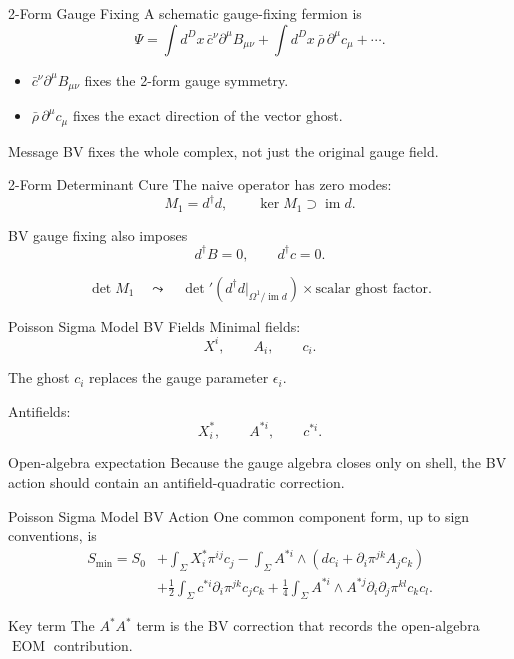 \documentclass[aspectratio=169,professionalfonts]{beamer}
\newcommand{\EOM}{\ensuremath{\operatorname{EOM}}}
\begin{document}
\begin{frame}{2-Form Gauge Fixing}
  A schematic gauge-fixing fermion is
  \[
    \Psi
    =\int d^Dx\,
    \bar c^\nu\partial^\mu B_{\mu\nu}
    +\int d^Dx\,\bar\rho\,\partial^\mu c_\mu+\cdots .
  \]

  \begin{itemize}
    \item $\bar c^\nu\partial^\mu B_{\mu\nu}$ fixes the 2-form gauge symmetry.
    \item $\bar\rho\,\partial^\mu c_\mu$ fixes the exact direction of the vector ghost.
  \end{itemize}

  \begin{block}{Message}
    BV fixes the whole complex, not just the original gauge field.
  \end{block}
\end{frame}

\begin{frame}{2-Form Determinant Cure}
  The naive operator has zero modes:
  \[
    M_1=d^\dagger d,
    \qquad
    \ker M_1\supset \operatorname{im}d .
  \]

  BV gauge fixing also imposes
  \[
    d^\dagger B=0,
    \qquad
    d^\dagger c=0 .
  \]

  \[
    \det M_1
    \quad\leadsto\quad
    \det{}'\!\left(d^\dagger d\big|_{\Omega^1/\operatorname{im}d}\right)
    \times
    \text{scalar ghost factor}.
  \]
\end{frame}

\begin{frame}{Poisson Sigma Model BV Fields}
  Minimal fields:
  \[
    X^i,
    \qquad
    A_i,
    \qquad
    c_i .
  \]

  The ghost $c_i$ replaces the gauge parameter $\epsilon_i$.

  Antifields:
  \[
    X_i^*,
    \qquad
    A^{*i},
    \qquad
    c^{*i}.
  \]

  \begin{block}{Open-algebra expectation}
    Because the gauge algebra closes only on shell, the BV action should
    contain an antifield-quadratic correction.
  \end{block}
\end{frame}

\begin{frame}{Poisson Sigma Model BV Action}
  \small
  One common component form, up to sign conventions, is
  \[
  \begin{aligned}
    S_{\min}=S_0
    &+\int_\Sigma X_i^*\pi^{ij}c_j
    -\int_\Sigma A^{*i}\wedge
    \left(dc_i+\partial_i\pi^{jk}A_jc_k\right)\\
    &+\frac12\int_\Sigma c^{*i}\partial_i\pi^{jk}c_jc_k
    +\frac14\int_\Sigma A^{*i}\wedge A^{*j}
    \partial_i\partial_j\pi^{kl}c_kc_l .
  \end{aligned}
  \]

  \begin{alertblock}{Key term}
    The $A^*A^*$ term is the BV correction that records the open-algebra
    \EOM{} contribution.
  \end{alertblock}
\end{frame}
\end{document}
